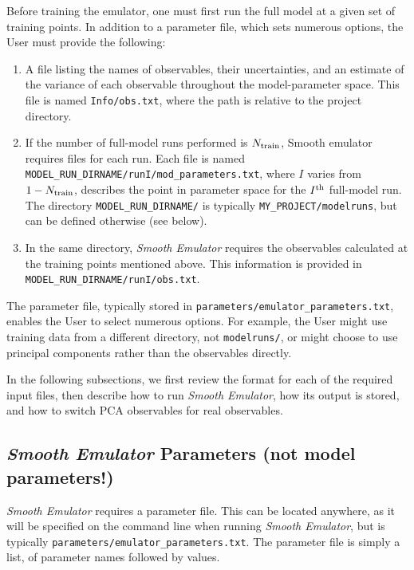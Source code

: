 \documentclass[UserManual.tex]{subfiles}
\begin{document}
Before training the emulator, one must first run the full model at a given set of training points. In addition to a parameter file, which sets numerous options, the User must provide the following:
\begin{enumerate}\itemsep=0pt
    \item A file listing the names of observables, their uncertainties, and an estimate of the variance of each observable throughout the model-parameter space. This file is named {\tt Info/obs.txt}, where the path is relative to the project directory. 
    \item If the number of full-model runs performed is $N_{\rm train}$, Smooth emulator requires files for each run. Each file is named {\tt MODEL\_RUN\_DIRNAME/runI/mod\_parameters.txt}, where $I$ varies from $1-N_{\rm train}$, describes the point in  parameter space for the $I^{\rm th}$ full-model run. The directory {\tt MODEL\_RUN\_DIRNAME/} is typically {\tt MY\_PROJECT/modelruns}, but can be defined otherwise (see below).
    \item In the same directory, {\it Smooth Emulator} requires the observables calculated at the training points mentioned above. This information is provided in {\tt MODEL\_RUN\_DIRNAME/runI/obs.txt}. 
\end{enumerate}
The parameter file, typically stored in {\tt parameters/emulator\_parameters.txt}, enables the User to select numerous options. For example, the User might use training data from a different directory, not {\tt modelruns/}, or might choose to use principal components rather than the observables directly. 

In the following subsections, we first review the format for each of the required input files, then describe how to run {\it Smooth Emulator}, how its output is stored, and how to switch PCA observables for real observables.

\subsection{{\it Smooth Emulator} Parameters (not model parameters!)}

{\it Smooth Emulator} requires a parameter file. This can be located anywhere, as it will be specified on the command line when running {\it Smooth Emulator}, but is typically {\tt parameters/emulator\_parameters.txt}. The parameter file is simply a list, of parameter names followed by values. 
\end{document}
